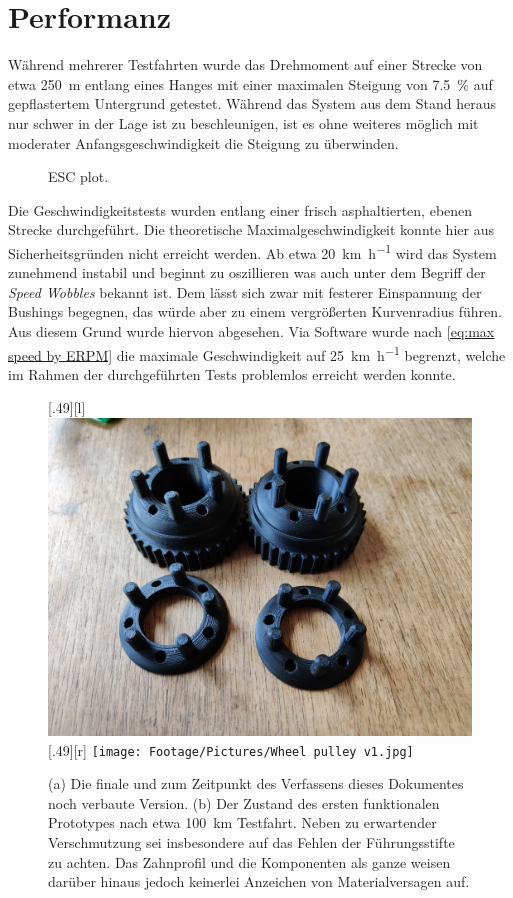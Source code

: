 	\section{Performanz}
		Während mehrerer Testfahrten wurde das Drehmoment auf einer Strecke von etwa \qty{250}{\metre} entlang eines Hanges mit einer maximalen Steigung von \qty{7,5}{\percent} auf gepflastertem Untergrund getestet.
		Während das System aus dem Stand heraus nur schwer in der Lage ist zu beschleunigen, ist es ohne weiteres möglich mit moderater Anfangsgeschwindigkeit die Steigung zu überwinden.
		\begin{figure}[h]
			\centering
			
			\caption[ESC plot]{ESC plot.}%
			\label{fig:ESC plot}
		\end{figure}
		Die Geschwindigkeitstests wurden entlang einer frisch asphaltierten, ebenen Strecke durchgeführt.
		Die theoretische Maximalgeschwindigkeit konnte hier aus Sicherheitsgründen nicht erreicht werden.
		Ab etwa \qty{20}{\kilo\metre\per\hour} wird das System zunehmend instabil und beginnt zu oszillieren was auch unter dem Begriff der \textit{Speed Wobbles} bekannt ist.
		Dem lässt sich zwar mit festerer Einspannung der Bushings begegnen, das würde aber zu einem vergrößerten Kurvenradius führen.
		Aus diesem Grund wurde hiervon abgesehen.
		Via Software wurde nach \cref{eq:max speed by ERPM} die maximale Geschwindigkeit auf \qty{25}{\kilo\metre\per\hour} begrenzt, welche im Rahmen der durchgeführten Tests problemlos erreicht werden konnte.
		\begin{figure}[h]
			\centering
			[.49\textwidth][l]{
				\includegraphics[angle=180, width=.49\textwidth]{Footage/Pictures/Wheel pulley v2.jpg}
			}
			[.49\textwidth][r]{
				\texttt{[image: Footage/Pictures/Wheel pulley v1.jpg]}
			}
			\caption[Vergleich der gedruckten Zahn- und Konterscheiben vor und nach mehreren Testfahrten]{(a) Die finale und zum Zeitpunkt des Verfassens dieses Dokumentes noch verbaute Version. (b) Der Zustand des ersten funktionalen Prototypes nach etwa \qty{100}{\kilo\metre} Testfahrt. Neben zu erwartender Verschmutzung sei insbesondere auf das Fehlen der Führungsstifte zu achten. Das Zahnprofil und die Komponenten als ganze weisen darüber hinaus jedoch keinerlei Anzeichen von Materialversagen auf.}
			\label{fig:comparison printed parts used unused}
		\end{figure}